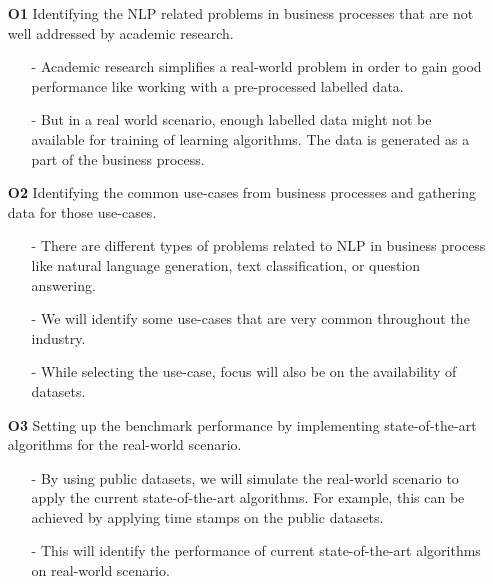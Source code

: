 \begin{itemize}

    \item[\textbf{O1}] Identifying the NLP related problems in business processes that are not well addressed by academic research.
    \begin{itemize}
        \item[-] Academic research simplifies a real-world problem in order to gain good performance like working with a pre-processed labelled data.
        \item[-] But in a real world scenario, enough labelled data might not be available for training of learning algorithms. The data is generated as a part of the business process.
    \end{itemize}
    
    \item[\textbf{O2}] Identifying the common use-cases from business processes and gathering data for those use-cases.
    \begin{itemize}
        \item[-] There are different types of problems related to NLP in business process like natural language generation, text classification, or question answering.
        \item[-] We will identify some use-cases that are very common throughout the industry.
        \item[-] While selecting the use-case, focus will also be on the availability of datasets.
    \end{itemize}
    
    \item[\textbf{O3}] Setting up the benchmark performance by implementing state-of-the-art algorithms for the real-world scenario.
    \begin{itemize}
        \item[-] By using public datasets, we will simulate the real-world scenario to apply the current state-of-the-art algorithms. For example, this can be achieved by applying time stamps on the public datasets. 
        \item[-] This will identify the performance of current state-of-the-art algorithms on real-world scenario.
    \end{itemize}
    

\end{itemize}
